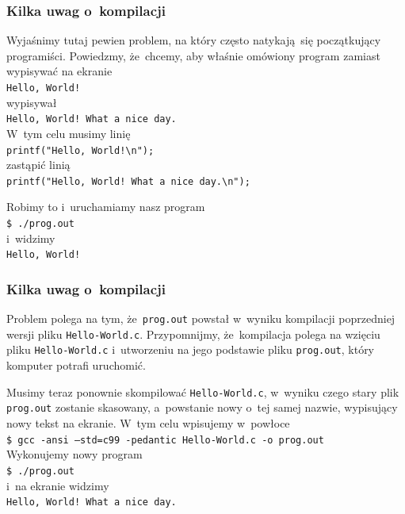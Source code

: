 \documentclass[10pt,t]{beamer}
\begin{document}
\begin{frame}
  \frametitle{Kilka uwag o~kompilacji}


  Wyjaśnimy tutaj pewien problem, na który często natykają~się
  początkujący programiści. Powiedzmy, że~chcemy, aby właśnie omówiony
  program zamiast wypisywać na ekranie \\
  \texttt{Hello, World!} \\
  wypisywał \\
  \texttt{Hello, World! What a~nice day.} \\
  W~tym celu musimy linię \\
  \texttt{printf("Hello, World!\textbackslash n");} \\
  zastąpić linią \\
  \texttt{printf("Hello, World! What a~nice day.\textbackslash n");}

  Robimy to i~uruchamiamy nasz program \\
  \texttt{\$ ./prog.out} \\
  i~widzimy \\
  \texttt{Hello, World!} \\

\end{frame}





\begin{frame}
  \frametitle{Kilka uwag o~kompilacji}


  Problem polega na tym, że~\texttt{prog.out} powstał w~wyniku kompilacji
  poprzedniej wersji pliku \texttt{Hello-World.c}. Przypomnijmy,
  że~kompilacja polega na wzięciu pliku \texttt{Hello-World.c} i~utworzeniu
  na jego podstawie pliku \texttt{prog.out}, który komputer potrafi
  uruchomić.

  Musimy teraz ponownie skompilować \texttt{Hello-World.c}, w~wyniku
  czego stary plik \texttt{prog.out} zostanie skasowany, a~powstanie
  nowy o~tej samej nazwie, wypisujący nowy tekst na ekranie.
  W~tym celu wpisujemy w~powłoce \\
  \texttt{\$ gcc -ansi --std=c99 -pedantic Hello-World.c -o
    prog.out} \\
  Wykonujemy \alert{nowy} program \\
  \texttt{\$ ./prog.out} \\
  i~na ekranie widzimy \\
  \texttt{Hello, World! What a~nice day.}

\end{frame}
\end{document}
